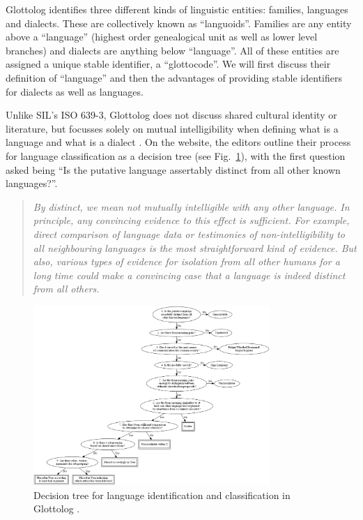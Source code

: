 \documentclass[unnumsec,webpdf,modern,medium]{oup-authoring-template}
\begin{document}
\begin{appendices}
Glottolog identifies three different kinds of linguistic entities: families, languages and dialects. These are collectively known as ``languoids''. Families are any entity above a ``language'' (highest order genealogical unit as well as lower level branches) and dialects are anything below ``language''. All of these entities are assigned a unique stable identifier, a ``glottocode''. We will first discuss their definition of ``language'' and then the advantages of providing stable identifiers for dialects as well as languages.

Unlike SIL's ISO 639-3, Glottolog does not discuss shared cultural identity or literature, but focusses solely on mutual intelligibility when defining what is a language and what is a dialect \citep{glottologlanguoids}. On the website, the editors outline their process for language classification as a decision tree (see Fig.~\ref{glottolog_class_tree}), with the first question asked being ``Is the putative language assertably distinct from all other known languages?''. 

\begin{quotation}
\noindent\emph{By distinct, we mean not mutually intelligible with any other language. In principle, any convincing evidence to this effect is sufficient. For example, direct comparison of language data or testimonies of non-intelligibility to all neighbouring languages is the most straightforward kind of evidence. But also, various types of evidence for isolation from all other humans for a long time could make a convincing case that a language is indeed distinct from all others.}
\end{quotation}
\begin{flushright} \citep{glottologlanguoids}\end{flushright}

\begin{figure}[ht]
\centering
\includegraphics[width=0.8\textwidth]{Glottolog_classifying_tree.png}
\caption[Decision tree for language identification and classification in Glottolog]{{Decision tree for language identification and classification in Glottolog \citep{glottologlanguoids}.}}
\label{glottolog_class_tree}
\end{figure}


\end{appendices}
\end{document}
